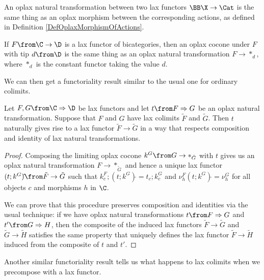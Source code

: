 \begin{example}
  An oplax natural transformation between two lax functors $\BB\X \to \Cat$ is the same thing as an oplax morphism between the corresponding actions, as defined in Definition \ref{DefOplaxMorphismOfActions}.
\end{example}
\begin{example}
  If $F\from \C \to \D$ is a lax functor of bicategories, then an oplax cocone under $F$ with tip $d\from \D$ is the same thing as an oplax natural transformation $F \to *_d$, where $*_d$ is the constant functor taking the value $d$.
\end{example}

We can then get a functoriality result similar to the usual one for ordinary colimits.

\begin{proposition}
  Let $F,G \from \C \Rightarrow \D$ be lax functors and let $t \from F \Rightarrow G$ be an oplax natural transformation.  
  Suppose that $F$ and $G$ have lax colimits $\tilde{F}$ and $\tilde{G}$.  
  Then $t$ naturally gives rise to a lax functor $\tilde{F} \to \tilde{G}$ in a way that respects composition and identity of lax natural transformations.
  \label{PropFunctorialityOfLaxColimits}
\end{proposition}
\begin{proof}
  Composing the limiting oplax cocone $k^G\from G \to *_{\tilde{G}}$ with $t$ gives us an oplax natural transformation $F \to *_{\tilde{G}}$ and hence a unique lax functor $(t;k^G)\hat{}\from \tilde{F} \to \tilde{G}$ such that $k^F_c;(t;k^G)\hat{}=t_c;k^G_c$ and $\nu^F_h(t;k^G)\hat{}=\nu^G_h$ for all objects $c$ and morphisms $h$ in $\C$.  

  We can prove that this procedure preserves composition and identities via the usual technique: if we have oplax natural transformations $t\from F \Rightarrow G$ and $t' \from G \Rightarrow H$, then the composite of the induced lax functors $\tilde{F} \to \tilde{G}$ and $\tilde{G}\to \tilde{H}$ satisfies the same property that uniquely defines the lax functor $\tilde{F} \to \tilde{H}$ induced from the composite of $t$ and $t'$.
\end{proof}

Another similar functoriality result tells us what happens to lax colimits when we precompose with a lax functor.

